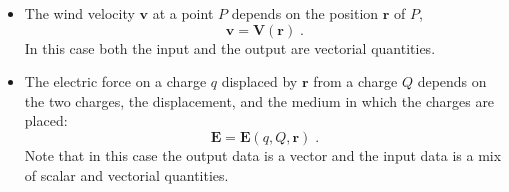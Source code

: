 \begin{frame}
\begin{itemize}
\item The wind velocity $\textbf{v}$ at a point $P$ depends on the position $\textbf{r}$ of $P$,
\[
\textbf{v} = \textbf{V} (\textbf{r})\; .
\]
In this case both the input and the output are vectorial quantities.

\item<2-> The electric force on a charge $q$ displaced by $\textbf{r}$ from a charge $Q$ depends on the two charges, the displacement, and the medium in which the charges are placed:
\[
\textbf{E} =\textbf{E}(q, Q,\textbf{r})\; .
\]
Note that in this case the output data is a vector and the input data is a mix of scalar and vectorial quantities.
\end{itemize}
\vskip 8cm
\end{frame}